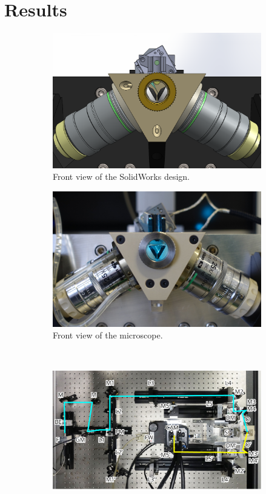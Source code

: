 \section{Results}
  \begin{figure}[htb]
    \begin{subfigure}[t]{0.5\textwidth}
      \centering
      \includegraphics[width=\textwidth]{photos/front_solidworks_overlay}
      \caption{Front view of the SolidWorks design.}
    \end{subfigure}
    \begin{subfigure}[t]{0.5\textwidth}
      \centering
      \includegraphics[width=\textwidth]{photos/front_photo_overlay}
      \caption{Front view of the microscope.}
    \end{subfigure}
    \\
    \begin{subfigure}[t]{1\textwidth}
      \centering
      \includegraphics[width=\textwidth]{photos/top+light}

\end{subfigure}
\end{figure}
